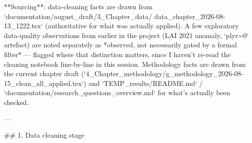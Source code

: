 **Sourcing**: data-cleaning facts are drawn from `documentation/august_draft/3_Chapter_data/
data_chapter_2026-08-13_1222.tex` (authoritative for what was actually applied). A few
exploratory data-quality observations from earlier in the project (LAI 2021 anomaly, `plyr=0`
artefact) are noted separately as *observed, not necessarily gated by a formal filter* — flagged
where that distinction matters, since I haven't re-read the cleaning notebook line-by-line in this
session. Methodology facts are drawn from the current chapter draft
(`4_Chapter_methodology/g_methodology_2026-08-15_clean_all_applied.tex`) and
`TEMP_results/README.md` / `documentation/research_questions_overview.md` for what's actually been
checked.

---

## 1. Data cleaning stage

